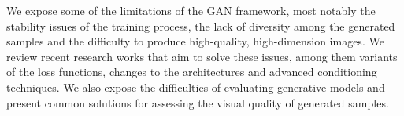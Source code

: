 We expose some of the limitations of the GAN framework, most notably the stability issues of the training process, the lack of diversity among the generated samples and the difficulty to produce high-quality, high-dimension images.  We review recent research works that aim to solve these issues, among them variants of the loss functions, changes to the architectures and advanced conditioning techniques. We also expose the difficulties of evaluating generative models and present common solutions for assessing the visual quality of generated samples.






